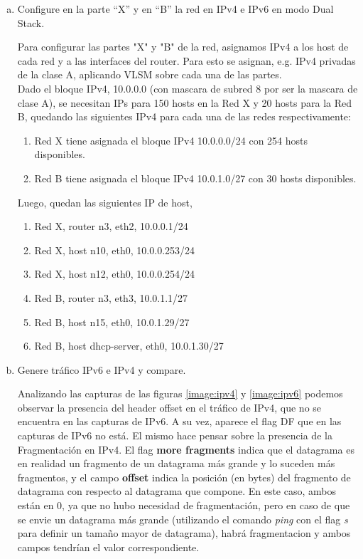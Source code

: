 \documentclass[osajnl,twocolumn,showpacs,superscriptaddress,10pt]{revtex4-1} %
\begin{document}
\begin{enumerate}[a)]
    \item Configure en la parte “X” y en “B” la red en IPv4 e IPv6 en modo Dual Stack.
    
    Para configurar las partes "X" y "B" de la red, asignamos IPv4 a los host de cada red y a las interfaces del router.
    Para esto se asignan, e.g. IPv4 privadas de la clase A, aplicando VLSM sobre cada una de las partes. \\

    Dado el bloque IPv4, 10.0.0.0 (con mascara de subred 8 por ser la mascara de clase A), se necesitan IPs para 150 hosts en la Red X y 20 hosts para la Red B,
    quedando las siguientes IPv4 para cada una de las redes respectivamente: \\

    \begin{enumerate}[1.]
        \item Red X tiene asignada el bloque IPv4 10.0.0.0/24 con 254 hosts disponibles.
        \item Red B tiene asignada el bloque IPv4 10.0.1.0/27 con 30 hosts disponibles.
    \end{enumerate}

    Luego, quedan las siguientes IP de host,

    \begin{enumerate}[1.]
        \item Red X, router n3, eth2, 10.0.0.1/24
        \item Red X, host n10, eth0, 10.0.0.253/24
        \item Red X, host n12, eth0, 10.0.0.254/24
        \item Red B, router n3, eth3, 10.0.1.1/27
        \item Red B, host n15, eth0, 10.0.1.29/27 
        \item Red B, host dhcp-server, eth0, 10.0.1.30/27
    \end{enumerate}
    
    \item Genere tráfico IPv6 e IPv4 y compare.
    
    Analizando las capturas de las figuras \ref{image:ipv4} y \ref{image:ipv6} podemos observar la presencia del header offset en el tráfico de IPv4,
    que no se encuentra en las capturas de IPv6. A su vez, aparece el flag DF que en las capturas de IPv6 no está.
    El mismo hace pensar sobre la presencia de la Fragmentación en IPv4. El flag \textbf{more fragments} indica que el datagrama es en realidad un fragmento de un 
    datagrama más grande y lo suceden más fragmentos, y el campo \textbf{offset} indica la posición (en bytes) del fragmento de datagrama con 
    respecto al datagrama que compone. En este caso, ambos están en 0, ya que no hubo necesidad de fragmentación, pero en caso de que se envie un datagrama 
    más grande (utilizando el comando \textit{ping} con el flag \textit{s} para definir un tamaño mayor de datagrama), habrá fragmentacion y ambos campos 
    tendrían el valor correspondiente. \\
    

\end{enumerate}
\end{document}
